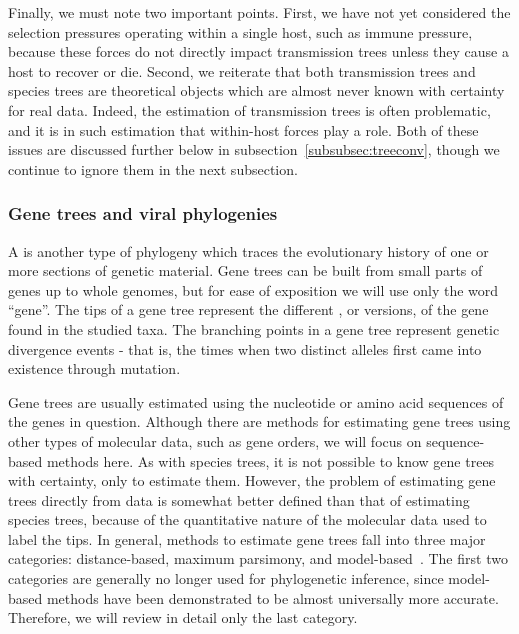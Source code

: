 Finally, we must note two important points. First, we have not yet considered
the selection pressures operating within a single host, such as immune
pressure, because these forces do not directly impact transmission trees unless
they cause a host to recover or die. Second, we reiterate that both
transmission trees and species trees are theoretical objects which are almost
never known with certainty for real data. Indeed, the estimation of
transmission trees is often problematic, and it is in such estimation that
within-host forces play a role. Both of these issues are discussed further
below in subsection~\ref{subsubsec:treeconv}, though we continue to ignore them
in the next subsection.

\subsubsection{Gene trees and viral phylogenies}
\label{subsubsec:genetree}

A  is another type of phylogeny which traces the evolutionary
history of one or more sections of genetic material. Gene trees can be built
from small parts of genes up to whole genomes, but for ease of exposition we
will use only the word ``gene''. The tips of a gene tree represent the
different , or versions, of the gene found in the studied taxa.
The branching points in a gene tree represent genetic divergence events - that
is, the times when two distinct alleles first came into existence through
mutation.

Gene trees are usually estimated using the nucleotide or amino acid sequences
of the genes in question. Although there are methods for estimating gene trees
using other types of molecular data, such as gene orders, we will focus on
sequence-based methods here. As with species trees, it is not possible to know
gene trees with certainty, only to estimate them. However, the problem of
estimating gene trees directly from data is somewhat better defined than that
of estimating species trees, because of the quantitative nature of the
molecular data used to label the tips. In general, methods to estimate gene
trees fall into three major categories: distance-based, maximum parsimony, and
model-based~\autocite{nei2000molecular}. The first two categories are generally
no longer used for phylogenetic inference, since model-based methods have been
demonstrated to be almost universally more accurate. Therefore, we will review
in detail only the last category.

